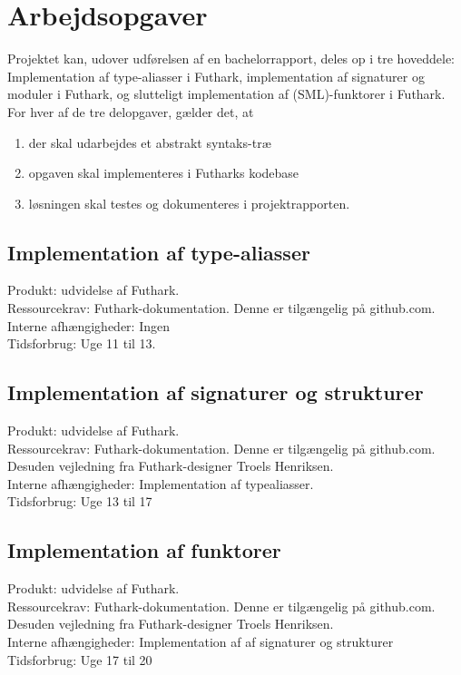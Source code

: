 \documentclass[12pt]{article}
\begin{document}
\section{Arbejdsopgaver}
Projektet kan, udover udførelsen af en bachelorrapport, deles op i tre
hoveddele:\\
Implementation af type-aliasser i Futhark, implementation af signaturer og
moduler i Futhark, og slutteligt implementation af (SML)-funktorer i Futhark.\\
For hver af de tre delopgaver, gælder det, at
\begin{enumerate}
  \item der skal udarbejdes et abstrakt syntaks-træ
  \item opgaven skal implementeres i Futharks kodebase
  \item løsningen skal testes og dokumenteres i projektrapporten.
\end{enumerate}


\subsection{Implementation af type-aliasser}
Produkt: udvidelse af Futhark. \\
Ressourcekrav: Futhark-dokumentation. Denne er tilgængelig på github.com\cite{futhark-repo}. \\
Interne afhængigheder: Ingen \\
Tidsforbrug: Uge 11 til 13. \\

\subsection{Implementation af signaturer og strukturer}
Produkt: udvidelse af Futhark. \\
Ressourcekrav: Futhark-dokumentation. Denne er tilgængelig på
github.com\cite{futhark-repo}. Desuden vejledning fra Futhark-designer Troels Henriksen.  \\
Interne afhængigheder: Implementation af typealiasser. \\
Tidsforbrug: Uge 13 til 17 \\


\subsection{Implementation af funktorer}
Produkt: udvidelse af Futhark. \\
Ressourcekrav: Futhark-dokumentation. Denne er tilgængelig på
github.com\cite{futhark-repo}.  
Desuden vejledning fra Futhark-designer Troels Henriksen. \\ 
Interne afhængigheder: Implementation af af signaturer og strukturer \\
Tidsforbrug: Uge 17 til 20 \\
\end{document}
